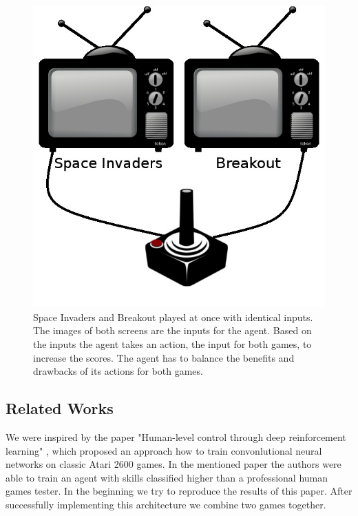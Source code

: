 \documentclass[10pt,twocolumn,letterpaper]{article}
\begin{document}
\begin{figure}[!h]
  \includegraphics[width=\linewidth]{overview.jpg}
  \caption{Space Invaders and Breakout played at once with identical inputs. The images of both screens are the inputs for the agent. Based on the inputs the agent takes an action, the input for both games, to increase the scores. The agent has to balance the benefits and drawbacks of its actions for both games.  }
  \label{fig:overview}
\end{figure}
    
\subsection{Related Works}
We were inspired by the paper "Human-level control through deep reinforcement learning" \cite{Mnih2015}, which proposed an approach how to train convonlutional neural networks on classic Atari 2600 games. In the mentioned paper the authors were able to train an agent with skills classified higher than a professional human games tester. In the beginning we try to reproduce the results of this paper. After successfully implementing this architecture we combine two games together.

    	 
\end{document}
